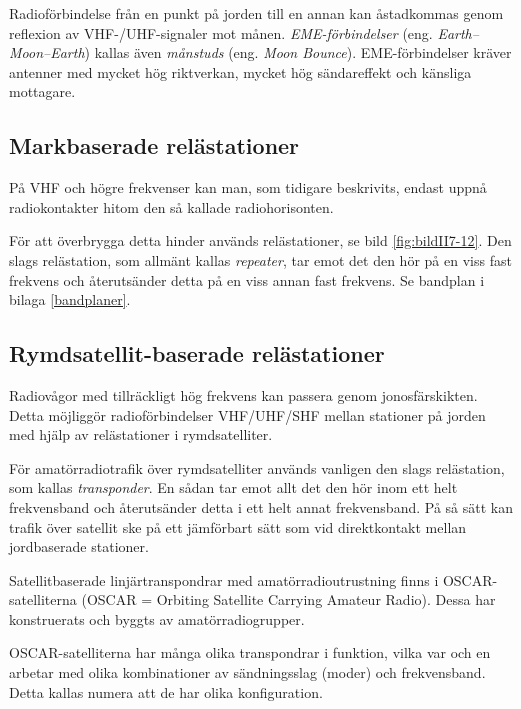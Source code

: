 Radioförbindelse från en punkt på jorden till en annan kan åstadkommas
genom reflexion av VHF-/UHF-signaler mot månen.
\emph{EME-förbindelser} (eng. \emph{Earth--Moon--Earth}) kallas även
\emph{månstuds} (eng. \emph{Moon Bou\-n\-ce}).
EME-förbindelser kräver antenner med mycket hög riktverkan, mycket hög
sändareffekt och känsliga mottagare.

\subsection{Markbaserade relästationer}


På VHF och högre frekvenser kan man, som tidigare beskrivits, endast
uppnå radiokontakter hitom den så kallade radiohorisonten.

För att överbrygga detta hinder används relästationer, se bild
\ref{fig:bildII7-12}.
Den slags relästation, som allmänt kallas \emph{repeater}, tar emot det den hör
på en viss fast frekvens och återutsänder detta på en viss annan fast frekvens.
Se bandplan i bilaga \ref{bandplaner}.

\subsection{Rymdsatellit-baserade relästationer}

Radiovågor med tillräckligt hög frekvens kan passera genom jonosfärskikten.
Detta möjliggör radioförbindelser VHF/UHF/SHF mellan
stationer på jorden med hjälp av relästationer i rymdsatelliter.

För amatörradiotrafik över rymdsatelliter används vanligen den slags
relästation, som kallas \emph{transponder}.
En sådan tar emot allt det den hör inom ett helt frekvensband och återutsänder
detta i ett helt annat frekvensband.
På så sätt kan trafik över satellit ske på ett jämförbart sätt som vid
direktkontakt mellan jordbaserade stationer.

Satellitbaserade linjärtranspondrar med amatörradioutrustning finns i
OSCAR-satelliterna (OSCAR = Orbiting Satellite Carrying Amateur Radio).
Dessa har konstruerats och byggts av amatörradiogrupper.

OSCAR-satelliterna har många olika transpondrar i funktion, vilka var och en
arbetar med olika kombinationer av sändningsslag (moder) och frekvensband.
Detta kallas numera att de har olika konfiguration.

